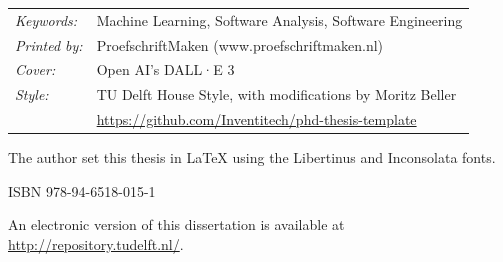 \begin{titlepage}
\noindent
\begin{tabular}{@{}p{}@{}p{}}
  \textit{Keywords:}  & Machine Learning, Software Analysis, Software Engineering \\[\medskipamount]
      \textit{Printed by:} & ProefschriftMaken (www.proefschriftmaken.nl) \\[\medskipamount]
      \textit{Cover:} & Open AI's DALL·E 3 \\[\medskipamount]
      \textit{Style:} & TU Delft House Style, with modifications by Moritz Beller \\& \url{https://github.com/Inventitech/phd-thesis-template} \\[\medskipamount]
\end{tabular}

\medskip
\medskip
\noindent The author set this thesis in \LaTeX\xspace using the Libertinus and Inconsolata fonts.

\vspace{\bigskipamount}



\noindent ISBN 978-94-6518-015-1

\medskip
\noindent An electronic version of this dissertation is available at \\
\url{http://repository.tudelft.nl/}.

\end{titlepage}

